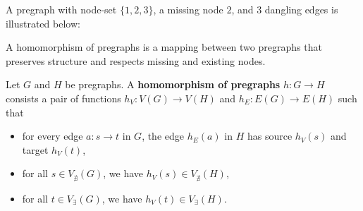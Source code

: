  \begin{example}
    \label{ex:pregraph}
     A pregraph with node-set $\{1,2,3\}$, a missing node $2$, and 3 dangling edges is illustrated below:
     \begin{center}
    \end{center}
 \end{example} 
 
 A homomorphism of pregraphs is a mapping between two pregraphs that preserves structure and respects missing and existing nodes.
 \begin{definition} 
    \label{def:pregraph:homomorphism}
    Let \( G \) and \( H \) be pregraphs. A \textbf{homomorphism of pregraphs} $h: G \mathop{\to} H$ consists a pair of functions $h_V: V(G) \mathop{\to} V(H) $ and $h_E: E(G) \mathop{\to} E(H)$ such that
    \begin{itemize}
        \item for every edge \( a \mathop{\colon} s \mathop{\to} t \) in \( G \), the edge \( h_E(a) \) in $H$ has source \( h_V(s) \) and target \( h_V(t) \),
        \item for all $s \mathop{\in} V_{\nexists}(G)$, we have $h_V(s) \mathop{\in} V_{\nexists}(H)$,
        \item for all $t \mathop{\in} V_\exists(G)$, we have $h_V(t) \mathop{\in} V_\exists(H)$.
    \end{itemize} 
\end{definition}

